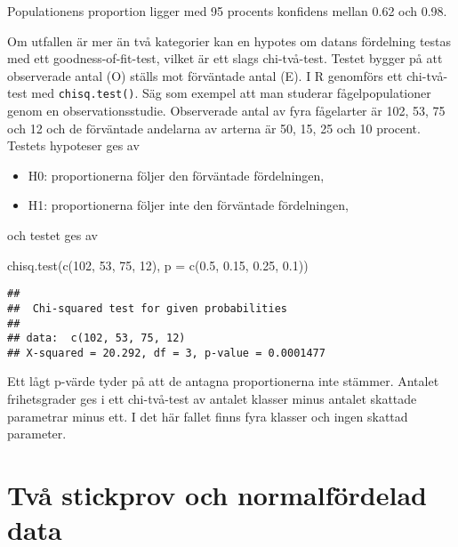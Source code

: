 \documentclass[
]{book}
\newenvironment{Shaded}{\begin{snugshade}}{\end{snugshade}}
\newcommand{\AttributeTok}[1]{\textcolor[rgb]{0.77,0.63,0.00}{#1}}
\newcommand{\DecValTok}[1]{\textcolor[rgb]{0.00,0.00,0.81}{#1}}
\newcommand{\FloatTok}[1]{\textcolor[rgb]{0.00,0.00,0.81}{#1}}
\newcommand{\FunctionTok}[1]{\textcolor[rgb]{0.00,0.00,0.00}{#1}}
\newcommand{\NormalTok}[1]{#1}
\providecommand{\tightlist}{%
  \setlength{\itemsep}{0pt}\setlength{\parskip}{0pt}}
\theoremstyle{definition}
\theoremstyle{definition}
\theoremstyle{definition}
\theoremstyle{definition}
\theoremstyle{remark}
\begin{document}
Populationens proportion ligger med 95 procents konfidens mellan 0.62 och 0.98.

Om utfallen är mer än två kategorier kan en hypotes om datans fördelning testas med ett goodness-of-fit-test, vilket är ett slags chi-två-test. Testet bygger på att observerade antal (O) ställs mot förväntade antal (E). I R genomförs ett chi-två-test med \texttt{chisq.test()}. Säg som exempel att man studerar fågelpopulationer genom en observationsstudie. Observerade antal av fyra fågelarter är 102, 53, 75 och 12 och de förväntade andelarna av arterna är 50, 15, 25 och 10 procent. Testets hypoteser ges av

\begin{itemize}
\tightlist
\item
  H0: proportionerna följer den förväntade fördelningen,
\item
  H1: proportionerna följer inte den förväntade fördelningen,
\end{itemize}

och testet ges av

\begin{Shaded}
\begin{Highlighting}[]
\FunctionTok{chisq.test}\NormalTok{(}\FunctionTok{c}\NormalTok{(}\DecValTok{102}\NormalTok{, }\DecValTok{53}\NormalTok{, }\DecValTok{75}\NormalTok{, }\DecValTok{12}\NormalTok{), }\AttributeTok{p =} \FunctionTok{c}\NormalTok{(}\FloatTok{0.5}\NormalTok{, }\FloatTok{0.15}\NormalTok{, }\FloatTok{0.25}\NormalTok{, }\FloatTok{0.1}\NormalTok{))}
\end{Highlighting}
\end{Shaded}

\begin{verbatim}
## 
##  Chi-squared test for given probabilities
## 
## data:  c(102, 53, 75, 12)
## X-squared = 20.292, df = 3, p-value = 0.0001477
\end{verbatim}

Ett lågt p-värde tyder på att de antagna proportionerna inte stämmer. Antalet frihetsgrader ges i ett chi-två-test av antalet klasser minus antalet skattade parametrar minus ett. I det här fallet finns fyra klasser och ingen skattad parameter.

\hypertarget{tvuxe5-stickprov-och-normalfuxf6rdelad-data}{%
\section{Två stickprov och normalfördelad data}\label{tvuxe5-stickprov-och-normalfuxf6rdelad-data}}
\end{document}
